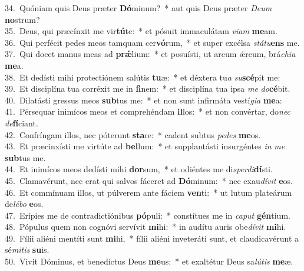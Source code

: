 {34.~}Quóniam quis Deus præter \textbf{Dó}minum?~* aut quis Deus præter \textit{De}\textit{um} \textbf{no}strum?\\
{35.~}Deus, qui præcínxit me vir\textbf{tú}te:~* et pósuit immaculátam \textit{vi}\textit{am} \textbf{me}am.\\
{36.~}Qui perfécit pedes meos tamquam cer\textbf{vó}rum,~* et super excélsa \textit{stá}\textit{tu}\textbf{ens} me.\\
{37.~}Qui docet manus meas ad \textbf{prǽ}lium:~* et posuísti, ut arcum ǽreum, brá\textit{chi}\textit{a} \textbf{me}a.\\
{38.~}Et dedísti mihi protectiónem salútis \textbf{tu}æ:~* et déxtera tu\textit{a} \textit{su}\textbf{scé}pit me:\\
{39.~}Et disciplína tua corréxit me in \textbf{fi}nem:~* et disciplína tua ipsa \textit{me} \textit{do}\textbf{cé}bit.\\
{40.~}Dilatásti gressus meos \textbf{sub}tus me:~* et non sunt infirmáta vestí\textit{gi}\textit{a} \textbf{me}a:\\
{41.~}Pérsequar inimícos meos et comprehéndam \textbf{il}los:~* et non convértar, do\textit{nec} \textit{de}\textbf{fí}ciant.\\
{42.~}Confríngam illos, nec póterunt \textbf{sta}re:~* cadent subtus \textit{pe}\textit{des} \textbf{me}os.\\
{43.~}Et præcinxísti me virtúte ad \textbf{bel}lum:~* et supplantásti insurgéntes \textit{in} \textit{me} \textbf{sub}tus me.\\
{44.~}Et inimícos meos dedísti mihi \textbf{dor}sum,~* et odiéntes me di\textit{sper}\textit{di}\textbf{dí}sti.\\
{45.~}Clamavérunt, nec erat qui salvos fáceret ad \textbf{Dó}minum:~* nec exau\textit{dí}\textit{vit} \textbf{e}os.\\
{46.~}Et commínuam illos, ut púlverem ante fáciem \textbf{ven}ti:~* ut lutum plateárum de\textit{lé}\textit{bo} \textbf{e}os.\\
{47.~}Erípies me de contradictiónibus \textbf{pó}puli:~* constítues me in \textit{ca}\textit{put} \textbf{gén}tium.\\
{48.~}Pópulus quem non cognóvi servívit \textbf{mi}hi:~* in audítu auris obe\textit{dí}\textit{vit} \textbf{mi}hi.\\
{49.~}Fílii aliéni mentíti sunt \textbf{mi}hi,~* fílii aliéni inveteráti sunt, et claudicavérunt a sé\textit{mi}\textit{tis} \textbf{su}is.\\
{50.~}Vivit Dóminus, et benedíctus Deus \textbf{me}us:~* et exaltétur Deus sa\textit{lú}\textit{tis} \textbf{me}æ.\\
